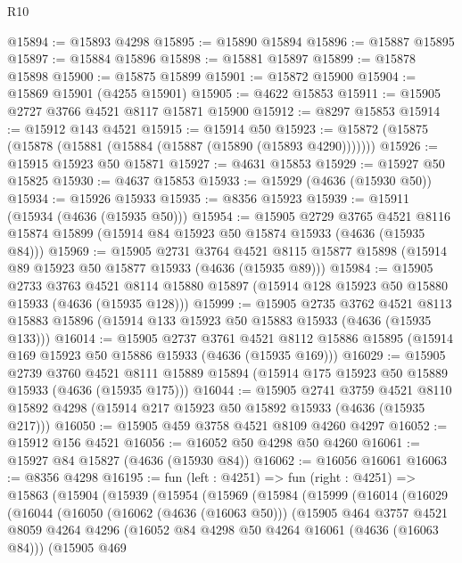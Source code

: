 \begin{lexlean}{R10}
\begin{coremodule}
@15894 := @15893 @4298
@15895 := @15890 @15894
@15896 := @15887 @15895
@15897 := @15884 @15896
@15898 := @15881 @15897
@15899 := @15878 @15898
@15900 := @15875 @15899
@15901 := @15872 @15900
@15904 := @15869 @15901 (@4255 @15901)
@15905 := @4622 @15853
@15911 := @15905 @2727 @3766 @4521 @8117 @15871 @15900
@15912 := @8297 @15853
@15914 := @15912 @143 @4521
@15915 := @15914 @50
@15923 := @15872 (@15875 (@15878 (@15881 (@15884 (@15887 (@15890 (@15893 @4290)))))))
@15926 := @15915 @15923 @50 @15871
@15927 := @4631 @15853
@15929 := @15927 @50 @15825
@15930 := @4637 @15853
@15933 := @15929 (@4636 (@15930 @50))
@15934 := @15926 @15933
@15935 := @8356 @15923
@15939 := @15911 (@15934 (@4636 (@15935 @50)))
@15954 := @15905
    @2729
    @3765
    @4521
    @8116
    @15874
    @15899
    (@15914 @84 @15923 @50 @15874 @15933 (@4636 (@15935 @84)))
@15969 := @15905
    @2731
    @3764
    @4521
    @8115
    @15877
    @15898
    (@15914 @89 @15923 @50 @15877 @15933 (@4636 (@15935 @89)))
@15984 := @15905
    @2733
    @3763
    @4521
    @8114
    @15880
    @15897
    (@15914 @128 @15923 @50 @15880 @15933 (@4636 (@15935 @128)))
@15999 := @15905
    @2735
    @3762
    @4521
    @8113
    @15883
    @15896
    (@15914 @133 @15923 @50 @15883 @15933 (@4636 (@15935 @133)))
@16014 := @15905
    @2737
    @3761
    @4521
    @8112
    @15886
    @15895
    (@15914 @169 @15923 @50 @15886 @15933 (@4636 (@15935 @169)))
@16029 := @15905
    @2739
    @3760
    @4521
    @8111
    @15889
    @15894
    (@15914 @175 @15923 @50 @15889 @15933 (@4636 (@15935 @175)))
@16044 := @15905
    @2741
    @3759
    @4521
    @8110
    @15892
    @4298
    (@15914 @217 @15923 @50 @15892 @15933 (@4636 (@15935 @217)))
@16050 := @15905 @459 @3758 @4521 @8109 @4260 @4297
@16052 := @15912 @156 @4521
@16056 := @16052 @50 @4298 @50 @4260
@16061 := @15927 @84 @15827 (@4636 (@15930 @84))
@16062 := @16056 @16061
@16063 := @8356 @4298
@16195 := fun (left : @4251) =>
  fun (right : @4251) =>
  @15863
    (@15904
      (@15939
        (@15954
          (@15969
            (@15984
              (@15999
                (@16014
                  (@16029
                    (@16044
                      (@16050
                        (@16062 (@4636 (@16063 @50)))
                        (@15905
                          @464
                          @3757
                          @4521
                          @8059
                          @4264
                          @4296
                          (@16052 @84 @4298 @50 @4264 @16061 (@4636 (@16063 @84)))
                          (@15905
                            @469

\end{coremodule}
\end{lexlean}

